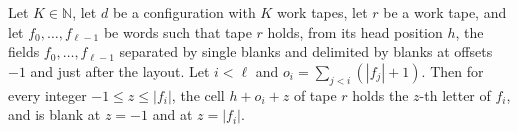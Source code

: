 \begin{lemma}
\label{Turing.cw_field}
\leanok
{}
Let $K\in\mathbb{N}$, let $d$ be a configuration with $K$ work tapes, let $r$ be a work tape,
and let $f_0,\dots,f_{\ell-1}$ be words such that tape $r$ holds, from its head position $h$,
the fields $f_0,\dots,f_{\ell-1}$ separated by single blanks and delimited by blanks at offsets
$-1$ and just after the layout. Let $i<\ell$ and $o_i=\sum_{j<i}(|f_j|+1)$. Then for every
integer $-1\le z\le|f_i|$, the cell $h+o_i+z$ of tape $r$ holds the $z$-th letter of $f_i$, and
is blank at $z=-1$ and at $z=|f_i|$.
\end{lemma}

